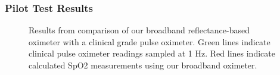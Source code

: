         \subsubsection{Pilot Test Results}
        \begin{figure}
            \begin{center}
            \end{center}
            \caption{Results from comparison of our broadband reflectance-based oximeter with a clinical grade pulse oximeter. Green lines indicate clinical pulse oximeter readings sampled at 1 Hz. Red lines indicate calculated SpO2 measurements using our broadband oximeter. } 
            \label{fig:D3results}
        \end{figure} 
